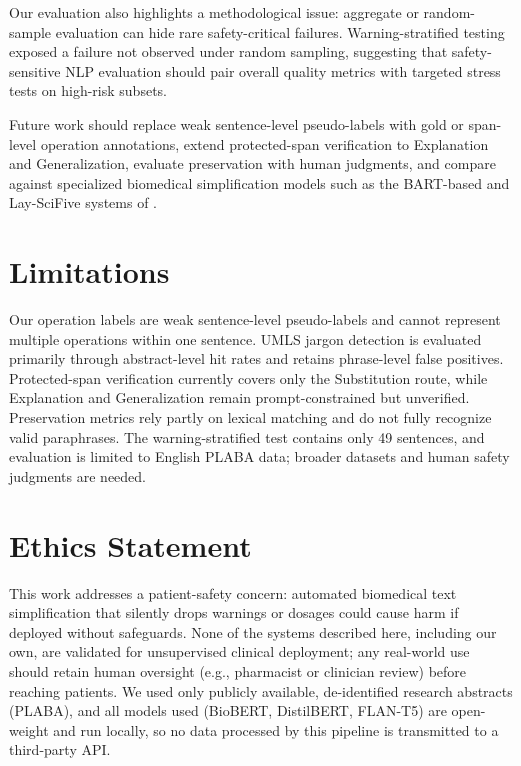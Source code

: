 \documentclass[11pt]{article}
\begin{document}
Our evaluation also highlights a methodological issue: aggregate or
random-sample evaluation can hide rare safety-critical failures.
Warning-stratified testing exposed a failure not observed under random
sampling, suggesting that safety-sensitive NLP evaluation should pair
overall quality metrics with targeted stress tests on high-risk subsets.

Future work should replace weak sentence-level pseudo-labels with gold or
span-level operation annotations, extend protected-span verification to
Explanation and Generalization, evaluate preservation with human judgments,
and compare against specialized biomedical simplification models such as the
BART-based and Lay-SciFive systems of \citet{li2024beemanc}.

\section*{Limitations}
Our operation labels are weak sentence-level pseudo-labels and cannot
represent multiple operations within one sentence. UMLS jargon detection is
evaluated primarily through abstract-level hit rates and retains
phrase-level false positives. Protected-span verification currently covers
only the Substitution route, while Explanation and Generalization remain
prompt-constrained but unverified. Preservation metrics rely partly on
lexical matching and do not fully recognize valid paraphrases. The
warning-stratified test contains only 49 sentences, and evaluation is
limited to English PLABA data; broader datasets and human safety judgments
are needed.

\section*{Ethics Statement}
This work addresses a patient-safety concern: automated biomedical text
simplification that silently drops warnings or dosages could cause harm if
deployed without safeguards. None of the systems described here, including
our own, are validated for unsupervised clinical deployment; any real-world
use should retain human oversight (e.g., pharmacist or clinician review)
before reaching patients. We used only publicly available, de-identified
research abstracts (PLABA), and all models used (BioBERT, DistilBERT,
FLAN-T5) are open-weight and run locally, so no data processed by this
pipeline is transmitted to a third-party API.



\end{document}
